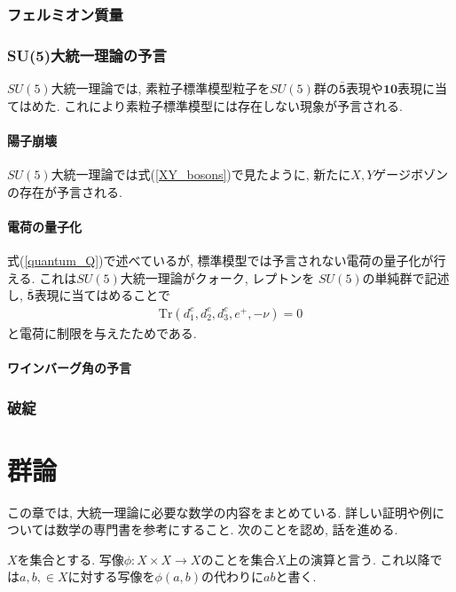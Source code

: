 \documentclass[uplatex,dvipdfmx,a4paper,titlepage]{jsbook}
\theoremstyle{plain}
\theoremstyle{definition}
\begin{document}
{\subsection{フェルミオン質量}

\subsection{SU(5)大統一理論の予言}
$SU(5)$大統一理論では, 素粒子標準模型粒子を$SU(5)$群の$\bar{\bm{5}}$表現や$\bm{10}$表現に当てはめた.
これにより素粒子標準模型には存在しない現象が予言される.
\subsubsection{陽子崩壊}
$SU(5)$大統一理論では式(\ref{XY_bosons})で見たように, 新たに$X, Y$ゲージボゾンの存在が予言される.
\subsubsection{電荷の量子化}
式(\ref{quantum_Q})で述べているが, 標準模型では予言されない電荷の量子化が行える.
これは$SU(5)$大統一理論がクォーク, レプトンを $SU(5)$の単純群で記述し, $\bar{\bm{5}}$表現に当てはめることで
\begin{align}
  \mathrm{Tr}(d^c_1, d^c_2, d^c_3, e^+, -\nu)=0 \nonumber
\end{align}
と電荷に制限を与えたためである.
\subsubsection{ワインバーグ角の予言}

\subsection{破綻}




\chapter{群論}
%
%
 この章では, 大統一理論に必要な数学の内容をまとめている.
 詳しい証明や例については数学の専門書を参考にすること.
 次のことを認め, 話を進める.

 $X$を集合とする.
 写像$\phi: X\times X \rightarrow X$のことを集合$X$上の演算と言う.
 これ以降では$a,b,\in X$に対する写像を$\phi(a, b)$の代わりに$ab$と書く.
}
\end{document}
